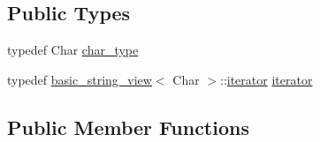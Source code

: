 \subsection*{Public Types}
\begin{DoxyCompactItemize}
\item 
typedef Char \hyperlink{classbasic__parse__context_a09eb161010dcd5587f3a425a6d6d4524}{char\+\_\+type}
\item 
typedef \hyperlink{classbasic__string__view}{basic\+\_\+string\+\_\+view}$<$ Char $>$\+::\hyperlink{classbasic__parse__context_ac3ff96575e89371a99076d8e84dbdbee}{iterator} \hyperlink{classbasic__parse__context_ac3ff96575e89371a99076d8e84dbdbee}{iterator}
\end{DoxyCompactItemize}
\subsection*{Public Member Functions}
